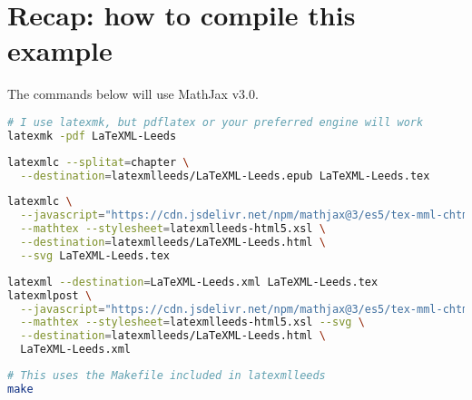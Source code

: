 \documentclass[a4paper]{article}
\theoremstyle{definition}
\begin{document}
\section{Recap: how to compile this example}
The commands below will use MathJax v3.0.
\begin{lstlisting}[language=bash,caption={Generate the PDF}]
# I use latexmk, but pdflatex or your preferred engine will work
latexmk -pdf LaTeXML-Leeds
\end{lstlisting}
\begin{lstlisting}[language=bash,caption={Generate the EPUB}]
latexmlc --splitat=chapter \
  --destination=latexmlleeds/LaTeXML-Leeds.epub LaTeXML-Leeds.tex
\end{lstlisting}
\begin{lstlisting}[language=bash,caption={Generate the HTML}]
latexmlc \
  --javascript="https://cdn.jsdelivr.net/npm/mathjax@3/es5/tex-mml-chtml.js" \
  --mathtex --stylesheet=latexmlleeds-html5.xsl \
  --destination=latexmlleeds/LaTeXML-Leeds.html \
  --svg LaTeXML-Leeds.tex
\end{lstlisting}
\begin{lstlisting}[language=bash,caption={Generate the HTML in two steps}]
latexml --destination=LaTeXML-Leeds.xml LaTeXML-Leeds.tex
latexmlpost \
  --javascript="https://cdn.jsdelivr.net/npm/mathjax@3/es5/tex-mml-chtml.js" \
  --mathtex --stylesheet=latexmlleeds-html5.xsl --svg \
  --destination=latexmlleeds/LaTeXML-Leeds.html \
  LaTeXML-Leeds.xml
\end{lstlisting}
\begin{lstlisting}[language=bash,caption={Do all the above steps in one go}]
# This uses the Makefile included in latexmlleeds
make
\end{lstlisting}
\end{document}
